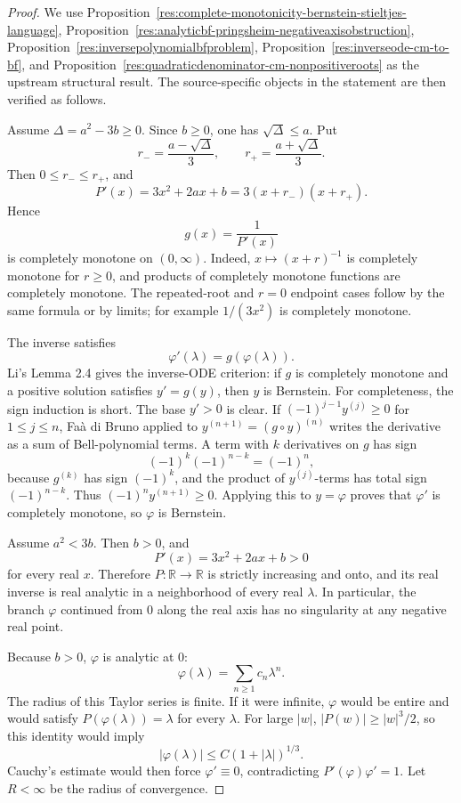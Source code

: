 \documentclass[11pt]{article}
\numberwithin{equation}{section}
\theoremstyle{definition}
\theoremstyle{remark}
\newcommand{\1}{\mathbf 1}
\begin{document}
\begin{proof}
We use Proposition~\ref{res:complete-monotonicity-bernstein-stieltjes-language}, Proposition~\ref{res:analyticbf-pringsheim-negativeaxisobstruction}, Proposition~\ref{res:inversepolynomialbfproblem}, Proposition~\ref{res:inverseode-cm-to-bf}, and Proposition~\ref{res:quadraticdenominator-cm-nonpositiveroots} as the upstream structural result. The source-specific objects in the statement are then verified as follows.

Assume \(\Delta=a^2-3b\ge0\). Since \(b\ge0\), one has \(\sqrt{\Delta}\le a\). Put
\[
r_-=\frac{a-\sqrt{\Delta}}3,\qquad
r_+=\frac{a+\sqrt{\Delta}}3.
\]
Then \(0\le r_-\le r_+\), and
\[
P'(x)=3x^2+2ax+b=3(x+r_-)(x+r_+).
\]
Hence
\[
g(x)=\frac1{P'(x)}
\]
is completely monotone on \((0,\infty)\). Indeed, \(x\mapsto (x+r)^{-1}\) is completely monotone for \(r\ge0\), and products of completely monotone functions are completely monotone. The repeated-root and \(r=0\) endpoint cases follow by the same formula or by limits; for example \(1/(3x^2)\) is completely monotone.

The inverse satisfies
\[
\varphi'(\lambda)=g(\varphi(\lambda)).
\]
Li's Lemma 2.4 gives the inverse-ODE criterion: if \(g\) is completely monotone and a positive solution satisfies \(y'=g(y)\), then \(y\) is Bernstein. For completeness, the sign induction is short. The base \(y'>0\) is clear. If \((-1)^{j-1}y^{(j)}\ge0\) for \(1\le j\le n\), Faà di Bruno applied to \(y^{(n+1)}=(g\circ y)^{(n)}\) writes the derivative as a sum of Bell-polynomial terms. A term with \(k\) derivatives on \(g\) has sign
\[
(-1)^k(-1)^{n-k}=(-1)^n,
\]
because \(g^{(k)}\) has sign \((-1)^k\), and the product of \(y^{(j)}\)-terms has total sign \((-1)^{n-k}\). Thus \((-1)^n y^{(n+1)}\ge0\). Applying this to \(y=\varphi\) proves that \(\varphi'\) is completely monotone, so \(\varphi\) is Bernstein.

Assume \(a^2<3b\). Then \(b>0\), and
\[
P'(x)=3x^2+2ax+b>0
\]
for every real \(x\). Therefore \(P:\mathbb R\to\mathbb R\) is strictly increasing and onto, and its real inverse is real analytic in a neighborhood of every real \(\lambda\). In particular, the branch \(\varphi\) continued from \(0\) along the real axis has no singularity at any negative real point.

Because \(b>0\), \(\varphi\) is analytic at \(0\):
\[
\varphi(\lambda)=\sum_{n\ge1}c_n\lambda^n.
\]
The radius of this Taylor series is finite. If it were infinite, \(\varphi\) would be entire and would satisfy \(P(\varphi(\lambda))=\lambda\) for every \(\lambda\). For large \(|w|\), \(|P(w)|\ge |w|^3/2\), so this identity would imply
\[
|\varphi(\lambda)|\le C(1+|\lambda|)^{1/3}.
\]
Cauchy's estimate would then force \(\varphi'\equiv0\), contradicting \(P'(\varphi)\varphi'=1\). Let \(R<\infty\) be the radius of convergence.


\end{proof}
\end{document}
